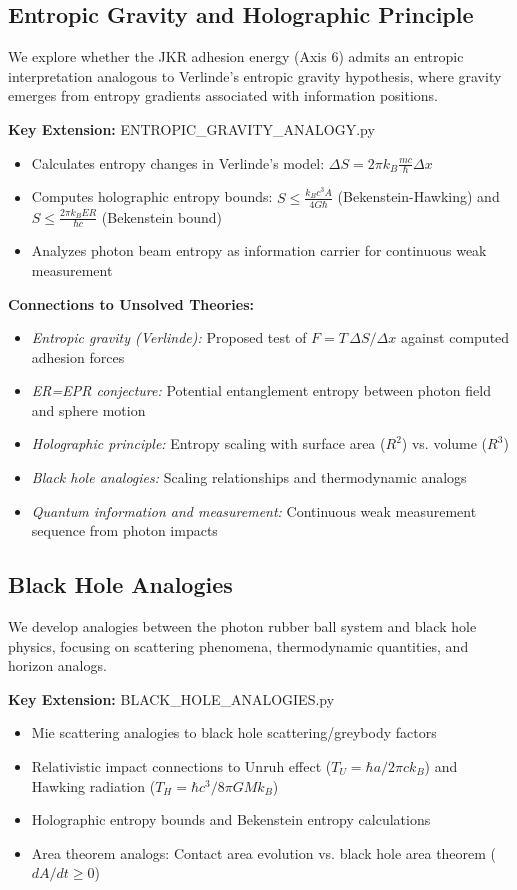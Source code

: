\documentclass[12pt,twoside]{article}
\begin{document}
\subsection{Entropic Gravity and Holographic Principle}
We explore whether the JKR adhesion energy (Axis 6) admits an entropic interpretation analogous to Verlinde's entropic gravity hypothesis, where gravity emerges from entropy gradients associated with information positions.

\textbf{Key Extension:} ENTROPIC\_GRAVITY\_ANALOGY.py
\begin{itemize}
\item Calculates entropy changes in Verlinde's model: $\Delta S = 2\pi k_B \frac{mc}{\hbar} \Delta x$
\item Computes holographic entropy bounds: $S \leq \frac{k_B c^3 A}{4G\hbar}$ (Bekenstein-Hawking) and $S \leq \frac{2\pi k_B E R}{\hbar c}$ (Bekenstein bound)
\item Analyzes photon beam entropy as information carrier for continuous weak measurement
\end{itemize}

\textbf{Connections to Unsolved Theories:}
\begin{itemize}
\item \textit{Entropic gravity (Verlinde):} Proposed test of $F = T\,\Delta S/\Delta x$ against computed adhesion forces
\item \textit{ER=EPR conjecture:} Potential entanglement entropy between photon field and sphere motion
\item \textit{Holographic principle:} Entropy scaling with surface area ($R^2$) vs. volume ($R^3$)
\item \textit{Black hole analogies:} Scaling relationships and thermodynamic analogs
\item \textit{Quantum information and measurement:} Continuous weak measurement sequence from photon impacts
\end{itemize}

\subsection{Black Hole Analogies}
We develop analogies between the photon rubber ball system and black hole physics, focusing on scattering phenomena, thermodynamic quantities, and horizon analogs.

\textbf{Key Extension:} BLACK\_HOLE\_ANALOGIES.py
\begin{itemize}
\item Mie scattering analogies to black hole scattering/greybody factors
\item Relativistic impact connections to Unruh effect ($T_U = \hbar a / 2\pi c k_B$) and Hawking radiation ($T_H = \hbar c^3 / 8\pi G M k_B$)
\item Holographic entropy bounds and Bekenstein entropy calculations
\item Area theorem analogs: Contact area evolution vs. black hole area theorem ($dA/dt \geq 0$)
\end{itemize}
\end{document}
